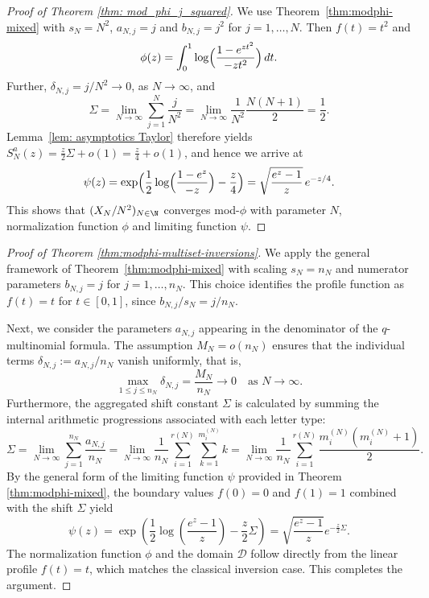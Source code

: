 \documentclass[11pt,a4paper]{scrartcl}
\numberwithin{equation}{section}
\theoremstyle{plain}
\theoremstyle{definition}
\theoremstyle{remark}
\newenvironment{proofof}[1]{\begin{proof}[Proof of #1]}{\end{proof}}
\begin{document}
\begin{proofof}{Theorem {\ref{thm: mod_phi_j_squared}}}
We use Theorem~\ref{thm:modphi-mixed} with $s_N=N^2$, $a_{N,j}=j$ and $b_{N,j}=j^2$ for $j=1,\ldots,N$.  Then $f(t)=t^{2}$ and
\[
\phi(z)=\int_{0}^{1} \log\Bigl(\frac{1-e^{zt^2}}{-zt^2}\Bigr)\,dt.
\]
Further, $\delta_{N,j}=j/N^{2}\to0$, as $N\to\infty$, and
\[
\Sigma = \lim_{N\to\infty}\sum_{j=1}^{N}\frac{j}{N^{2}} = \lim_{N\to\infty} \frac{1}{N^2} \frac{N(N+1)}{2} = \frac12.
\]
Lemma~\ref{lem: asymptotics Taylor} therefore yields $S_N^a(z)=\frac{z}{2}\Sigma+o(1)=\frac{z}{4}+o(1)$, and hence we arrive at
\[
\psi(z)=\exp\Bigl(\frac12 \log\Bigl(\frac{1-e^{z}}{-z}\Bigr)-\frac{z}{4}\Bigr)=\sqrt{\frac{e^{z}-1}{z}}\,e^{-z/4}.
\]
This shows that $(X_N/N^2)_{N\in\N}$ converges mod-$\phi$ with parameter $N$, normalization function $\phi$ and limiting function $\psi$.
\end{proofof}

\begin{proofof}{Theorem {\ref{thm:modphi-multiset-inversions}}}
We apply the general framework of Theorem~\ref{thm:modphi-mixed} with scaling $s_N=n_N$ and numerator parameters $b_{N,j}=j$ for $j=1,\ldots,n_N$. This choice identifies the profile function as $f(t)=t$ for $t \in [0,1]$, since $b_{N,j}/s_N = j/n_N$. 

Next, we consider the parameters $a_{N,j}$ appearing in the denominator of the $q$-multinomial formula. The assumption $M_N = o(n_N)$ ensures that the individual terms $\delta_{N,j} := a_{N,j}/n_N$ vanish uniformly, that is,
\[
\max_{1 \le j \le n_N} \delta_{N,j} = \frac{M_N}{n_N} \longrightarrow 0 \quad \text{as } N \to \infty.
\]
Furthermore, the aggregated shift constant $\Sigma$ is calculated by summing the internal arithmetic progressions associated with each letter type:
\[
\Sigma = \lim_{N\to\infty} \sum_{j=1}^{n_N} \frac{a_{N,j}}{n_N} = \lim_{N\to\infty} \frac{1}{n_N} \sum_{i=1}^{r(N)} \sum_{k=1}^{m_i^{(N)}} k = \lim_{N\to\infty} \frac{1}{n_N} \sum_{i=1}^{r(N)} \frac{m_i^{(N)}(m_i^{(N)}+1)}{2}.
\]
By the general form of the limiting function $\psi$ provided in Theorem \ref{thm:modphi-mixed}, the boundary values $f(0)=0$ and $f(1)=1$ combined with the shift $\Sigma$ yield
\[
\psi(z) = \exp\left( \frac{1}{2} \log\left( \frac{e^z - 1}{z} \right) - \frac{z}{2} \Sigma \right) = \sqrt{\frac{e^z - 1}{z}} e^{-\frac{z}{2}\Sigma}.
\]
The normalization function $\phi$ and the domain $\mathscr{D}$ follow directly from the linear profile $f(t)=t$, which matches the classical inversion case. This completes the argument.
\end{proofof}
\end{document}
